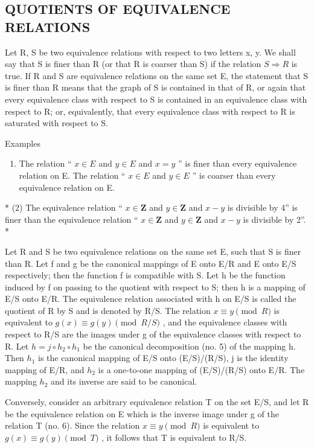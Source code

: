 \subsection{QUOTIENTS OF EQUIVALENCE RELATIONS}

Let R, S be two equivalence relations with respect to two letters x, y. We shall say that S is finer than R (or that R is coarser than S) if the relation \(S \Longrightarrow R\) is true. If R and S are equivalence relations on the same set E, the statement that S is finer than R means that the graph of S is contained in that of R, or again that every equivalence class with respect to S is contained in an equivalence class with respect to R; or, equivalently, that every equivalence class with respect to R is saturated with respect to S.

Examples

\begin{enumerate}
\def\labelenumi{(\arabic{enumi})}
\tightlist
\item
  The relation `` \(x \in E\) and \(y \in E\) and \(x = y\) '' is finer than every equivalence relation on E. The relation `` \(x \in E\) and \(y \in E\) '' is coarser than every equivalence relation on E.
\end{enumerate}

* (2) The equivalence relation `` \(x \in \mathbf{Z}\) and \(y \in \mathbf{Z}\) and \(x - y\) is divisible by 4'' is finer than the equivalence relation `` \(x \in \mathbf{Z}\) and \(y \in \mathbf{Z}\) and \(x - y\) is divisible by 2''. *

Let R and S be two equivalence relations on the same set E, such that S is finer than R. Let f and g be the canonical mappings of E onto E/R and E onto E/S respectively; then the function f is compatible with S. Let h be the function induced by f on passing to the quotient with respect to S; then h is a mapping of E/S onto E/R. The equivalence relation associated with h on E/S is called the quotient of R by S and is denoted by R/S. The relation \(x \equiv y \pmod{R}\) is equivalent to \(g(x) \equiv g(y) \pmod{R/S}\) , and the equivalence classes with respect to R/S are the images under g of the equivalence classes with respect to R. Let \(h = j \circ h_{2} \circ h_{1}\) be the canonical decomposition (no. 5) of the mapping h. Then \(h_{1}\) is the canonical mapping of E/S onto (E/S)/(R/S), j is the identity mapping of E/R, and \(h_{2}\) is a one-to-one mapping of (E/S)/(R/S) onto E/R. The mapping \(h_{2}\) and its inverse are said to be canonical.

Conversely, consider an arbitrary equivalence relation T on the set E/S, and let R be the equivalence relation on E which is the inverse image under g of the relation T (no. 6). Since the relation \(x \equiv y \pmod{R}\) is equivalent to \(g(x) \equiv g(y) \pmod{T}\) , it follows that T is equivalent to R/S.

